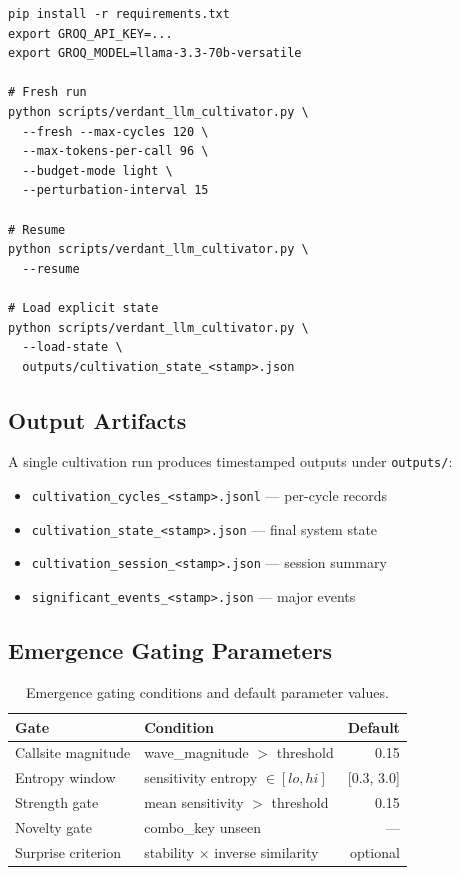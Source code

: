 \documentclass[11pt,a4paper]{article}
\begin{document}
\begin{verbatim}
pip install -r requirements.txt
export GROQ_API_KEY=...
export GROQ_MODEL=llama-3.3-70b-versatile

# Fresh run
python scripts/verdant_llm_cultivator.py \
  --fresh --max-cycles 120 \
  --max-tokens-per-call 96 \
  --budget-mode light \
  --perturbation-interval 15

# Resume
python scripts/verdant_llm_cultivator.py \
  --resume

# Load explicit state
python scripts/verdant_llm_cultivator.py \
  --load-state \
  outputs/cultivation_state_<stamp>.json
\end{verbatim}

\subsection{Output Artifacts}

A single cultivation run produces timestamped outputs under \texttt{outputs/}:

\begin{itemize}[nosep]
    \item \texttt{cultivation\_cycles\_<stamp>.jsonl} --- per-cycle records
    \item \texttt{cultivation\_state\_<stamp>.json} --- final system state
    \item \texttt{cultivation\_session\_<stamp>.json} --- session summary
    \item \texttt{significant\_events\_<stamp>.json} --- major events
\end{itemize}

\subsection{Emergence Gating Parameters}

\begin{table}[H]
\centering
\begin{tabular}{llr}
\toprule
\textbf{Gate} & \textbf{Condition} & \textbf{Default} \\
\midrule
Callsite magnitude & wave\_magnitude $>$ threshold & 0.15 \\
Entropy window & sensitivity entropy $\in [lo, hi]$ & [0.3, 3.0] \\
Strength gate & mean sensitivity $>$ threshold & 0.15 \\
Novelty gate & combo\_key unseen & --- \\
Surprise criterion & stability $\times$ inverse similarity & optional \\
\bottomrule
\end{tabular}
\caption{Emergence gating conditions and default parameter values.}
\label{tab:gating}
\end{table}
\end{document}

